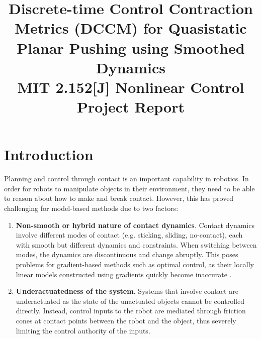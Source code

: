 \documentclass[journal]{IEEEtran}
\begin{document}
\title{Discrete-time Control Contraction Metrics (DCCM) for Quasistatic Planar Pushing using Smoothed Dynamics\\
{\footnotesize MIT 2.152[J] Nonlinear Control Project Report}
}

\author{
}

\maketitle

\begin{abstract}

\end{abstract}

\section{Introduction}
Planning and control through contact is an important capability in robotics. In order for robots to manipulate objects in their environment, they need to be able to reason about how to make and break contact. However, this has proved challenging for model-based methods due to two factors:
\begin{enumerate}
	\item{\bf Non-smooth or hybrid nature of contact dynamics}. Contact dynamics involve different modes of contact (e.g. sticking, sliding, no-contact), each with smooth but different dynamics and constraints. When switching between modes, the dynamics are discontinuous and change abruptly. This poses problems for gradient-based methods such as optimal control, as their locally linear models constructed using gradients quickly become inaccurate \autocite{pangGlobalPlanningContactRich2023}.
	\item{\bf Underactuatedness of the system}. Systems that involve contact are underactuated as the state of the unactuated objects cannot be controlled directly. Instead, control inputs to the robot are mediated through friction cones at contact points between the robot and the object, thus severely limiting the control authority of the inputs.
\end{enumerate}
\end{document}
